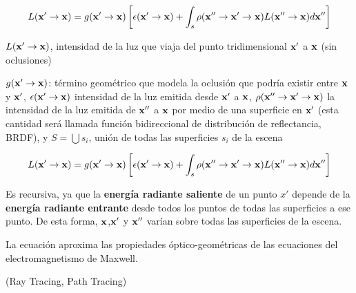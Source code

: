 \documentclass[spanish]{beamer}
\begin{document}
\begin{frame}
$$ L(\bold{x'} \rightarrow \bold{x}) =  g(\bold{x'}  \rightarrow \bold{x})  \left[ \epsilon(\bold{x'}  \rightarrow \bold{x}) + \int_{s}{\rho(\bold{x''}  \rightarrow \bold{x'}  \rightarrow \bold{x})L(\bold{x''}  \rightarrow \bold{x}) d\bold{x''}} \right] $$

$L(\bold{x'} \rightarrow \bold{x})$, intensidad de la luz que viaja del punto tridimensional $\bold{x'}$ a $\bold{x}$ (sin oclusiones)

$g(\bold{x'} \rightarrow \bold{x})$: término geométrico que modela la oclusión que podría existir entre $\bold{x}$ y $\bold{x'}$, $\epsilon(\bold{x'} \rightarrow \bold{x})$ intensidad de la luz emitida desde $\bold{x'}$ a $\bold{x}$, $\rho(\bold{x''}  \rightarrow \bold{x'}  \rightarrow \bold{x})$ la intensidad de la luz emitida de $\bold{x''}$ a $\bold{x}$ por medio de una superficie en $\bold{x'}$ (esta cantidad será llamada función bidireccional de distribución de reflectancia, BRDF), y $S=\bigcup{s_{i}}$, unión de todas las superficies $s_{i}$ de la escena
\end{frame}

\begin{frame}

\begin{equation*}
L(\bold{x'} \rightarrow \bold{x}) =  g(\bold{x'}  \rightarrow \bold{x})  \left[ \epsilon(\bold{x'}  \rightarrow \bold{x}) + \int_{s}{\rho(\bold{x''}  \rightarrow \bold{x'}  \rightarrow \bold{x})L(\bold{x''}  \rightarrow \bold{x}) d\bold{x''}} \right]
\end{equation*}

Es recursiva, ya que la \textbf{energía radiante saliente} de un punto $x'$ depende de la \textbf{energía radiante entrante} desde todos los puntos de todas las superficies a ese punto.
De esta forma, $\bold{x}$,$\bold{x'}$ y $\bold{x''}$ varían sobre todas las superficies de la escena.

La ecuación aproxima las propiedades óptico-geométricas de las ecuaciones del electromagnetismo de Maxwell.

(Ray Tracing, Path Tracing)
\end{frame}
\end{document}
